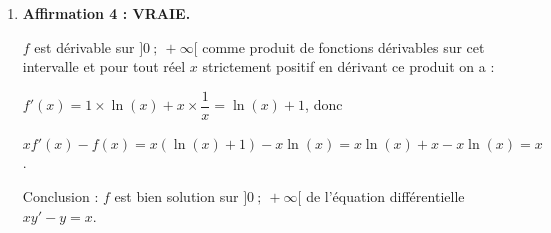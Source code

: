 \begin{enumerate}
Il y a donc $\np{60000} -\np{39366}=\np{20634}$ codes contenant au moins un zéro.

	\item \textbf{Affirmation 4 : VRAIE.}


$f$ est dérivable sur $]0~;~+\infty[$ comme produit de fonctions dérivables sur cet intervalle et pour tout réel $x$ strictement positif en dérivant ce produit  on a : 

$f'(x) = 1 \times \ln(x) + x\times \dfrac{1}{x}= \ln(x) + 1$, donc

$xf'(x) - f(x)= x \left(\ln(x) + 1\right) - x\ln(x) = x\ln(x) + x - x\ln(x) = x$.

Conclusion : $f$ est bien solution sur $]0~;~+\infty[$ de l'équation différentielle $xy' - y = x$.
\end{enumerate}

\bigskip
